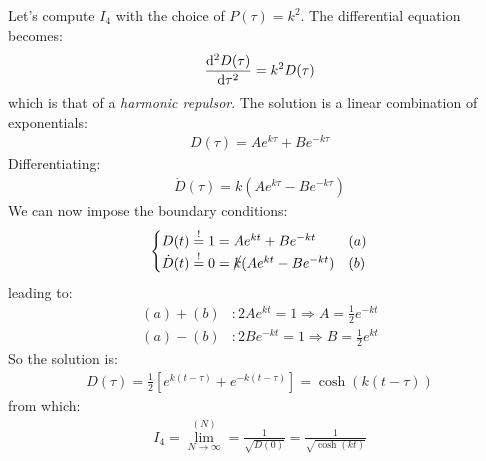 \documentclass[../template.tex]{subfiles}
\begin{document}
\begin{example}[$p(\tau) = k^2$, free end-point]
    Let's compute $I_4$ with the choice of $P(\tau) = k^2$. The differential equation becomes:
    \begin{align*}
        \dv[2]{D(\tau)}{\tau} = k^2 D(\tau)
    \end{align*}  
    which is that of a \textit{harmonic repulsor}. The solution is a linear combination of exponentials:
    \begin{align*}
        D(\tau) = A e^{k \tau} + Be^{-k \tau}
    \end{align*} 
    Differentiating:
    \begin{align*}
        \dot{D}(\tau) = k(Ae^{k \tau} - B e^{-k \tau})
    \end{align*}
    We can now impose the boundary conditions:
    \begin{align*}
        \begin{cases}
            D(t) \overset{!}{=}  1 = A e^{kt} + Be^{-kt} & (a)\\
            \dot{D}(t) \overset{!}{=} 0 = \cancel{k}(A e^{kt} - Be^{-kt}) & (b)
        \end{cases}
    \end{align*}
    leading to:
    \begin{align*}
        (a) + (b)&\colon 2 A e^{kt} = 1 \Rightarrow A = \frac{1}{2} e^{-kt}\\
        (a) - (b)&\colon 2Be^{-kt} = 1 \Rightarrow B = \frac{1}{2}e^{kt}  
    \end{align*}
    So the solution is:
    \begin{align*}
        D(\tau) = \frac{1}{2}\left[e^{k(t-\tau)} + e^{-k(t-\tau)}\right] = \cosh(k(t-\tau)) 
    \end{align*}
    from which:
    \begin{align*}
        I_4 = \lim_{N \to\infty }^{(N)} = \frac{1}{\sqrt{D(0)}} = \frac{1}{\sqrt{\cosh(kt)}}  
    \end{align*}
\end{example}
\end{document}
